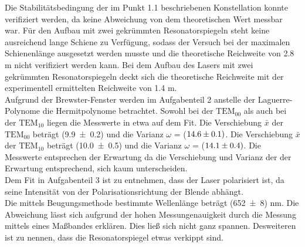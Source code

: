 Die Stabilitätsbedingung der im Punkt 1.1 beschriebenen Konstellation konnte verifiziert werden, da keine Abweichung von dem theoretischen Wert messbar war. Für den Aufbau mit zwei gekrümmten Resonatorspiegeln steht keine ausreichend lange Schiene zu Verfügung, sodass der Versuch bei der maximalen Schienenlänge ausgesetzt werden musste und die theoretische Reichweite von 2.8 m nicht verifiziert werden kann. Bei dem Aufbau des Lasers mit zwei gekrümmten Resonatorspiegeln deckt sich die theoretische Reichweite mit der experimentell ermittelten Reichweite von 1.4 m. \\
Aufgrund der Brewster-Fenster werden im Aufgabenteil 2 anstelle der Laguerre-Polynome die Hermitpolynome betrachtet. Sowohl bei der $\text{TEM}_{00}$ als auch bei der $\text{TEM}_{10}$ liegen die Messwerte in etwa auf dem Fit. Die Verschiebung $\bar{x}$ der $\text{TEM}_{00}$ beträgt (\num{9.9 +- 0.2}) und die Varianz $\omega$ = ($\num{14.6 +- 0.1})$. Die Verschiebung $\bar{x}$ der $\text{TEM}_{10}$ beträgt (\num{10.0 +- 0.5}) und die Varianz $\omega$ = ($\num{14.1 +- 0.4})$. Die Messwerte entsprechen der Erwartung da die Verschiebung und Varianz der der Erwartung entsprechend, sich kaum unterscheiden. 	\\
Dem Fit in Aufgabenteil 3 ist zu entnehmen, dass der Laser polarisiert ist, da seine Intensität von der Polarisationsrichtung der Blende abhängt. \\
Die mittels Beugungsmethode bestimmte Wellenlänge beträgt (\num{652 +- 8}) nm. Die Abweichung lässt sich aufgrund der hohen Messungenauigkeit durch die Messung mittels eines Maßbandes erklären. Dies ließ sich nicht ganz spannen. Desweiteren ist zu nennen, dass die Resonatorspiegel etwas verkippt sind.
